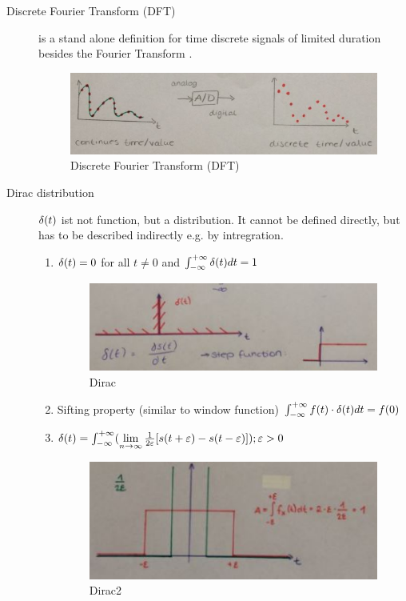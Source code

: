 \begin{description}
	\item[Discrete Fourier Transform (DFT)] is a stand alone definition for time discrete signals of limited duration besides the Fourier Transform .
		\begin{figure}[!h]
			\centering
			\includegraphics[width=0.7\linewidth]{images_LA/DFT}
			\caption{Discrete Fourier Transform (DFT)}
			\label{fig:DFT}
		\end{figure}
	\item[Dirac distribution] $\delta(t)$ ist not function, but a distribution. It cannot be defined directly, but has to be described indirectly e.g. by intregration.
		\begin{enumerate}
			\item $ \delta(t)=0$ for all $t\neq0$ and $\int_{-\infty}^{+\infty}\delta(t) dt = 1 $
				\begin{figure}[!h]
					\centering
					\includegraphics[width=0.7\linewidth]{images_LA/dirac1}
					\caption{Dirac}
					\label{fig:dirac1}
				\end{figure}
			\item Sifting property (similar to window function)
			$\int_{-\infty}^{+\infty} f(t) \cdot \delta(t) dt = f(0) $
			\item $\delta(t) = \int_{-\infty}^{+\infty}(\lim\limits_{n \to \infty} \frac{1}{2\varepsilon}[s(t+\varepsilon)-s(t-\varepsilon)] ); \varepsilon>0 $
				\begin{figure}[!h]
					\centering
					\includegraphics[width=0.7\linewidth]{images_LA/dirac2}
					\caption{Dirac2}

\end{figure}
\end{enumerate}
\end{description}

